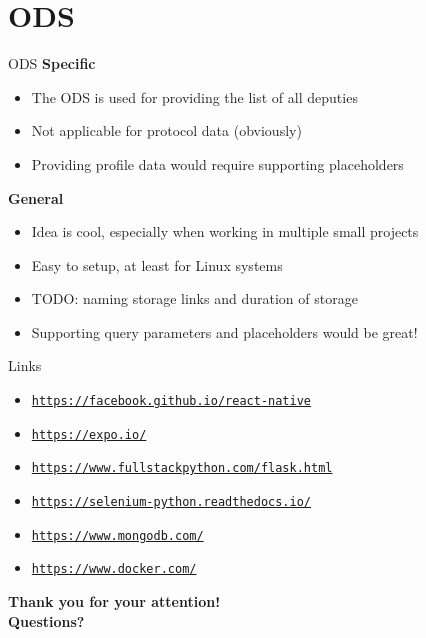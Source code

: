 \documentclass{beamer}
\begin{document}
  \section{ODS}
  \begin{frame}[plain]{ODS}
    \textbf{Specific}
    \begin{itemize}
      \item The ODS is used for providing the list of all deputies
      \item Not applicable for protocol data (obviously)
      \item Providing profile data would require supporting placeholders
    \end{itemize}
    \textbf{General}
    \begin{itemize}
      \item Idea is cool, especially when working in multiple small projects
      \item Easy to setup, at least for Linux systems
      \item TODO: naming storage links and duration of storage
      \item Supporting query parameters and placeholders would be great! 
    \end{itemize} 
  \end{frame}

  \begin{frame}[plain]{Links}
    \begin{itemize}
      \item[] \label{link-react-native}\href{https://facebook.github.io/react-native}{\texttt{https://facebook.github.io/react-native}}
      \item[] \label{link-expo}\href{https://expo.io/}{\texttt{https://expo.io/}}
      \item[] \label{link-flask}\href{https://www.fullstackpython.com/flask.html}{\texttt{https://www.fullstackpython.com/flask.html}}
      \item[] \label{link-selenium}\href{https://selenium-python.readthedocs.io/}{\texttt{https://selenium-python.readthedocs.io/}}
      \item[] \label{link-mongodb}\href{https://www.mongodb.com/}{\texttt{https://www.mongodb.com/}}
      \item[] \label{link-mongodb}\href{https://www.docker.com/}{\texttt{https://www.docker.com/}}
    \end{itemize}
  \end{frame}



  \begin{frame}[plain]{}
    \centering
    \Large \textbf{Thank you for your attention!}\\
    \vspace{2em}
    \Large \textbf{Questions?}
  \end{frame}
\end{document}

